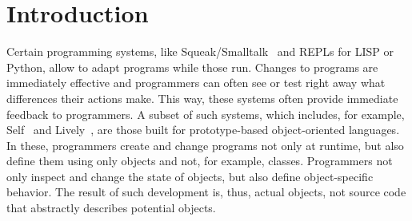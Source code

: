 
\chapter{Introduction} \label{chapter:INTRODUCTION}

Certain programming systems, like Squeak/Smalltalk~\cite{GoldbergRobson83} and REPLs for LISP or Python, allow to adapt programs while those run.
Changes to programs are immediately effective and programmers can often see or test right away what differences their actions make.
This way, these systems often provide immediate feedback to programmers.
A subset of such systems, which includes, for example, Self~\cite{Ungar1987SPS,Ungar2007SEL} and Lively~\cite{Ingalls2008LKS,Krahn2009LWD}, are those built for prototype-based object-oriented languages.
In these, programmers create and change programs not only at runtime, but also define them using only objects and not, for example, classes.
Programmers not only inspect and change the state of objects, but also define object-specific behavior.
The result of such development is, thus, actual objects, not source code that abstractly describes potential objects.

